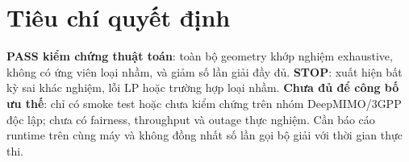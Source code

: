 \documentclass[12pt,onecolumn]{IEEEtran}
\begin{document}
\section{Tiêu chí quyết định}
\textbf{PASS kiểm chứng thuật toán}: toàn bộ geometry khớp nghiệm exhaustive, không có ứng viên loại nhầm, và giảm số lần giải đầy đủ. \textbf{STOP}: xuất hiện bất kỳ sai khác nghiệm, lỗi LP hoặc trường hợp loại nhầm. \textbf{Chưa đủ để công bố ưu thế}: chỉ có smoke test hoặc chưa kiểm chứng trên nhóm DeepMIMO/3GPP độc lập; chưa có fairness, throughput và outage thực nghiệm. Cần báo cáo runtime trên cùng máy và không đồng nhất số lần gọi bộ giải với thời gian thực thi.
\end{document}
